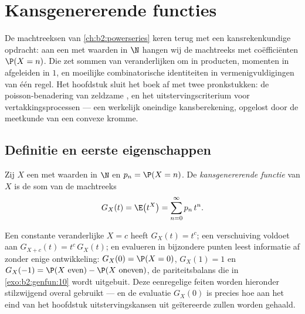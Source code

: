 \chapter{Kansgenererende functies}\label{ch:b2:genfun}

De machtreeksen van \cref{ch:b2:powerseries} keren terug met een
kansrekenkundige opdracht: aan een  met waarden
in $\N$ hangen wij de machtreeks met coëfficiënten $\P(X = n)$. Die
\emph{} zet sommen van 
veranderlijken om in producten, momenten in afgeleiden in $1$, en
moeilijke combinatorische identiteiten in vermenigvuldigingen van
één regel. Het hoofdstuk sluit het boek af met twee pronkstukken:
de poisson-benadering van zeldzame , en het
uitstervingscriterium voor vertakkingsprocessen --- een werkelijk
oneindige kansberekening,  opgelost door de meetkunde van
een convexe kromme.

\section{Definitie en eerste eigenschappen}

\begin{definition}\label{def:b2:genfun:pgf}
Zij $X$ een  met waarden in $\N$ en $p_n = \P(X
= n)$. De \emph{kansgenererende functie} van $X$ is de som van de machtreeks
\[
G_X(t) = \E\bigl(t^X\bigr) = \sum_{n=0}^{\infty} p_n\,t^n .
\]
\end{definition}

\begin{example}\label{ex:b2:genfun:firstreflexes}
Een constante veranderlijke $X = c$ heeft $G_X(t) = t^c$; een
verschuiving voldoet aan $G_{X+c}(t) = t^c\,G_X(t)$; en evalueren
in bijzondere punten leest informatie af zonder enige
ontwikkeling: $G_X(0) = \P(X = 0)$, $G_X(1) = 1$ en $G_X(-1) =
\P(X\text{ even}) - \P(X\text{ oneven})$, de pariteitsbalans die in
\cref{exo:b2:genfun:10} wordt uitgebuit. Deze eenregelige feiten
worden hieronder stilzwijgend overal gebruikt --- en de evaluatie
$G_X(0)$ is precies hoe aan het eind van het hoofdstuk
uitstervingskansen uit geïtereerde  zullen
worden gehaald.
\end{example}

